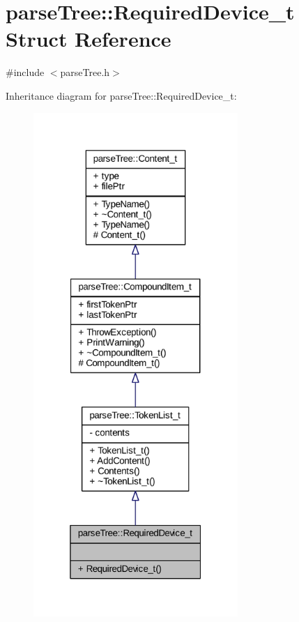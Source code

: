 \hypertarget{structparse_tree_1_1_required_device__t}{}\section{parse\+Tree\+:\+:Required\+Device\+\_\+t Struct Reference}
\label{structparse_tree_1_1_required_device__t}


{\ttfamily \#include $<$parse\+Tree.\+h$>$}



Inheritance diagram for parse\+Tree\+:\+:Required\+Device\+\_\+t\+:
\nopagebreak
\begin{figure}[H]
\begin{center}
\leavevmode
\includegraphics[width=220pt]{structparse_tree_1_1_required_device__t__inherit__graph}
\end{center}
\end{figure}


